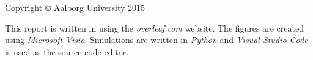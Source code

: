 \thispagestyle{empty}
{\small
\strut\vfill %
\noindent Copyright \copyright{} Aalborg University 2015\par
\vspace{0.2cm}
\noindent This report is written in \LaTeXe{} using the \textit{overleaf.com} website. The figures are created using \textit{Microsoft Visio}. Simulations are written in \textit{Python} and \textit{Visual Studio Code} is used as the source code editor. 
}
\clearpage